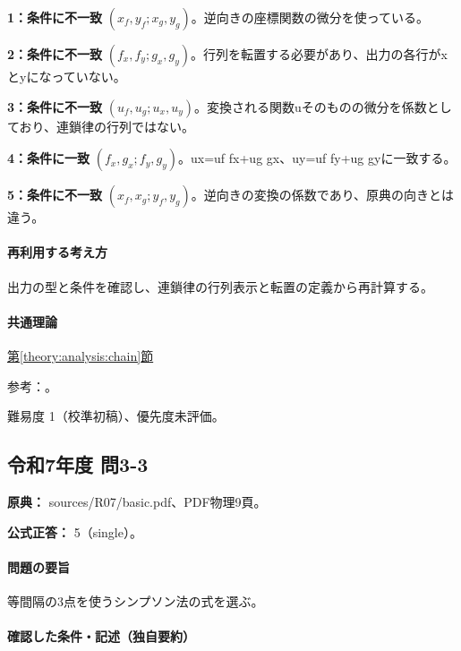 \noindent\textbf{1：条件に不一致} \((x_f,y_f;x_g,y_g)\)。逆向きの座標関数の微分を使っている。\par

\noindent\textbf{2：条件に不一致} \((f_x,f_y;g_x,g_y)\)。行列を転置する必要があり、出力の各行がxとyになっていない。\par

\noindent\textbf{3：条件に不一致} \((u_f,u_g;u_x,u_y)\)。変換される関数uそのものの微分を係数としており、連鎖律の行列ではない。\par

\noindent\textbf{4：条件に一致} \((f_x,g_x;f_y,g_y)\)。ux=\allowbreak{}uf fx+ug gx、uy=\allowbreak{}uf fy+ug gyに一致する。\par

\noindent\textbf{5：条件に不一致} \((x_f,x_g;y_f,y_g)\)。逆向きの変換の係数であり、原典の向きとは違う。\par

\paragraph{再利用する考え方} 出力の型と条件を確認し、連鎖律の行列表示と転置の定義から再計算する。

\paragraph{共通理論} \hyperref[theory:analysis:chain]{第\ref*{theory:analysis:chain}節}

\par 参考：\cite{mit_chain2007}。

\par 難易度 1（校準初稿）、優先度未評価。

\subsection{令和7年度 問3-3}
\label{q:r07-reg-basic-3-3}

\noindent\textbf{原典：} sources/R07/basic.pdf、PDF物理9頁。

\textbf{公式正答：} 5（single）。

\paragraph{問題の要旨} 等間隔の3点を使うシンプソン法の式を選ぶ。

\paragraph{確認した条件・記述（独自要約）}\mbox{}\par

